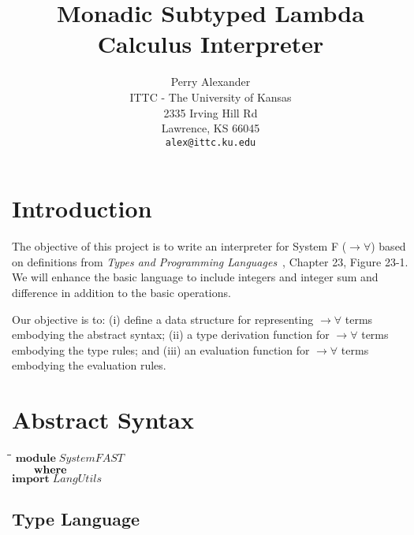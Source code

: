 \documentclass[10pt]{article}
\title{Monadic Subtyped Lambda Calculus Interpreter}
\author{Perry Alexander \\
  ITTC - The University of Kansas \\
  2335 Irving Hill Rd \\
  Lawrence, KS 66045 \\
  \texttt{alex@ittc.ku.edu}}
\newlength{\lwidth}\setlength{\lwidth}{4.5cm}
\newlength{\cwidth}\setlength{\cwidth}{8mm} %
\newcommand{\Conid}[1]{\mathit{#1}}
\begin{document}
\maketitle

\section{Introduction}

The objective of this project is to write an interpreter for System F
($\rightarrow\forall$) based on definitions from \emph{Types and
Programming Languages}~\cite{Pie02a}, Chapter 23, Figure 23-1.  We
will enhance the basic language to include integers and integer sum
and difference in addition to the basic operations.

Our objective is to: (i) define a data structure for representing
$\rightarrow\forall$ terms embodying the abstract syntax; (ii) a type
derivation function for $\rightarrow\forall$ terms embodying the type
rules; and (iii) an evaluation function for $\rightarrow\forall$
terms embodying the evaluation rules.

\section{Abstract Syntax}

\begin{tabbing}
\qquad\=\hspace{\lwidth}\=\hspace{\cwidth}\=\+\kill
${\mathbf{module}\;\Conid{SystemFAST}}$\\
${\hskip2.00em\relax\mathbf{where}}$\\
${}$\\
${\mathbf{import}\;\Conid{LangUtils}}$
\end{tabbing}
\subsection{Type Language}
\end{document}
